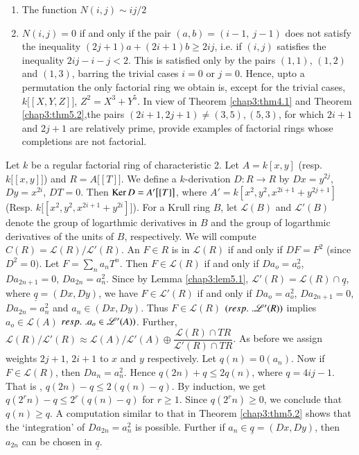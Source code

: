 \begin{remarks*} %
\begin{enumerate}[1)]
\item The function $N (i, j) \sim ij / 2$ 

\item  $N (i, j) = 0$ if and only if the pair $(a, b) = (i-1, ~ j - 1)
  $ does not satisfy the inequality $(2 j +1)a + (2i+1)b \ge 2ij$,
  i.e. if $(i, j)$ satisfies the inequality $2 ij - i - j < 2$. This
  is satisfied only by the pairs $(1, 1)$, $(1, 2)$ and $(1, 3)$,
  barring the trivial cases $i=0$ or $j = 0$. Hence, upto a
  permutation the only factorial ring we obtain is, except for the
  trivial cases, $k \big[[X, Y, Z]\big]$, $Z^2 = X^3 + Y^5$. In view
  of Theorem \ref{chap3:thm4.1} and Theorem
  \ref{chap3:thm5.2},\pageoriginale the 
  pairs $(2 i +1, 2j +1) \neq (3,5), (5, 3)$, for which $2i +1$ and
  $2j+1$ are relatively prime, provide examples of factorial rings
  whose completions are not factorial.  
\end{enumerate}
    \end{remarks*}    

\medskip
{}
    Let $k$ be a regular factorial ring of characteristic 2. Let $A
    = k [x, y]$ (resp. $k \big[[x, y ]\big]$) and $R = A
    \big[[T]\big]$. We define a $k$-derivation $D : R \to R$ by $Dx  = 
    y^{2j}$, $Dy = x^{2i}$, $DT = 0$. Then $\operatorname{Ker} D = A' \big[[T]\big]$,
    where $A' = k[x^2, y^2, x^{2i+1} + y^{2j +1}]$ (Resp. $k\big
    [[x^2, y^2, x^{2i+1}+ y^{2i}] \big ]$). For a Krull ring $B$, let
    $\mathscr{L} (B)$ and $\mathscr{L}'(B)$  denote the group of
    logarthmic derivatives in $B$ and the  group of logarthmic
    derivatives of the units of $B$, respectively. We will compute
    $C(R) = \mathscr{L} (R) \big/\mathscr{L}'(R)$. An $F \in R$ is
    in $\mathscr{L} (R)$ if and only if $DF = F^2$ (since $D^2  =
    0)$. Let $F = \sum\limits_n a_n T^n$. Then $F \in \mathscr{L}(R)$
    if and  only if $Da_o = a^2_o$, $Da_{2n+1} = 0$, $Da_{2n} =
    a^2_n$. Since by Lemma \ref{chap3:lem5.1}, $\mathscr{L}' (R) =
    \mathscr{L}(R) 
    \cap \underline{q}$, where $\underline{q} = (Dx, Dy)$, we have $F
    \in \mathscr{L}' (R)$ if and only if $Da_o = a^2_o$, $Da_{2n +1} =
    0$, $Da_{2n} = a^2_n $ and $a_n \in (Dx, Dy)$. Thus $F \in
    \mathscr{L} (R)$ $({resp.}\kern.3em . \mathscr{L}' (R))$ implies $a_o \in
    \mathscr{L}(A)$  ${resp.}\kern.3em. a_o \in \mathscr{L}' (A))$. Further,
    $\mathscr{L} (R) \big /\mathscr{L}'(R) \approx \mathscr{L}(A)
    \big/ \mathscr{L}'(A) \oplus \dfrac{\mathscr{L}(R) \cap 
      TR}{\mathscr{L}' (R) \cap TR}$. As before we assign weights $2j
    +1$, $2i+1$ to $x$ and $y$ respectively. Let $q(n) = 0(a_n)$. Now if $F
    \in \mathscr{L}(R)$, then $Da_n = a^2_n$. Hence $q(2n) + q \le
    2q(n)$, where $q = 4ij - 1$. That is , $q(2n) - q \le
    2(q(n)-q)$. By induction, we get $q(2^r n) - q \le 2^r (q(n) - q)$
    for $r \ge 1$. Since $q(2^r n) \ge 0$, we conclude that $q(n) \ge
    q$. A computation similar to that in Theorem \ref{chap3:thm5.2}
    shows that the 
    `integration' of $Da_{2n} = a^2_n$ is possible. Further if $a_n
    \in \underline{q} = (Dx, Dy)$, then $a_{2n}$ can be chosen in
    $\underline{q}$. 

